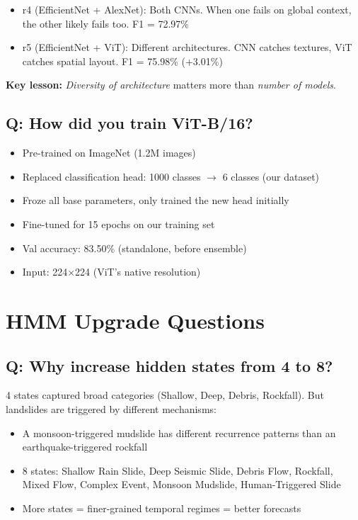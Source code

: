 \documentclass[11pt]{article}
\begin{document}
\begin{itemize}[noitemsep]
    \item r4 (EfficientNet + AlexNet): Both CNNs. When one fails on global context, the other likely fails too. F1 = 72.97\%
    \item r5 (EfficientNet + ViT): Different architectures. CNN catches textures, ViT catches spatial layout. F1 = 75.98\% (+3.01\%)
\end{itemize}

\textbf{Key lesson:} \textit{Diversity of architecture} matters more than \textit{number of models}.

\subsection{Q: How did you train ViT-B/16?}

\begin{itemize}[noitemsep]
    \item Pre-trained on ImageNet (1.2M images)
    \item Replaced classification head: 1000 classes $\to$ 6 classes (our dataset)
    \item Froze all base parameters, only trained the new head initially
    \item Fine-tuned for 15 epochs on our training set
    \item Val accuracy: 83.50\% (standalone, before ensemble)
    \item Input: 224$\times$224 (ViT's native resolution)
\end{itemize}

\section{HMM Upgrade Questions}

\subsection{Q: Why increase hidden states from 4 to 8?}

4 states captured broad categories (Shallow, Deep, Debris, Rockfall). But landslides are triggered by different mechanisms:
\begin{itemize}[noitemsep]
    \item A monsoon-triggered mudslide has different recurrence patterns than an earthquake-triggered rockfall
    \item 8 states: Shallow Rain Slide, Deep Seismic Slide, Debris Flow, Rockfall, Mixed Flow, Complex Event, Monsoon Mudslide, Human-Triggered Slide
    \item More states = finer-grained temporal regimes = better forecasts
\end{itemize}
\end{document}
